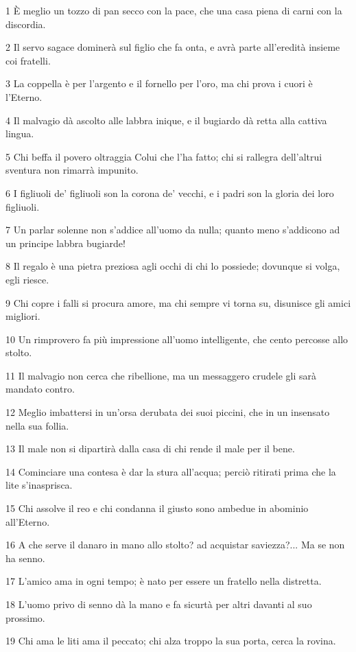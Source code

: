 \par 1 È meglio un tozzo di pan secco con la pace, che una casa piena di carni con la discordia.
\par 2 Il servo sagace dominerà sul figlio che fa onta, e avrà parte all'eredità insieme coi fratelli.
\par 3 La coppella è per l'argento e il fornello per l'oro, ma chi prova i cuori è l'Eterno.
\par 4 Il malvagio dà ascolto alle labbra inique, e il bugiardo dà retta alla cattiva lingua.
\par 5 Chi beffa il povero oltraggia Colui che l'ha fatto; chi si rallegra dell'altrui sventura non rimarrà impunito.
\par 6 I figliuoli de' figliuoli son la corona de' vecchi, e i padri son la gloria dei loro figliuoli.
\par 7 Un parlar solenne non s'addice all'uomo da nulla; quanto meno s'addicono ad un principe labbra bugiarde!
\par 8 Il regalo è una pietra preziosa agli occhi di chi lo possiede; dovunque si volga, egli riesce.
\par 9 Chi copre i falli si procura amore, ma chi sempre vi torna su, disunisce gli amici migliori.
\par 10 Un rimprovero fa più impressione all'uomo intelligente, che cento percosse allo stolto.
\par 11 Il malvagio non cerca che ribellione, ma un messaggero crudele gli sarà mandato contro.
\par 12 Meglio imbattersi in un'orsa derubata dei suoi piccini, che in un insensato nella sua follia.
\par 13 Il male non si dipartirà dalla casa di chi rende il male per il bene.
\par 14 Cominciare una contesa è dar la stura all'acqua; perciò ritirati prima che la lite s'inasprisca.
\par 15 Chi assolve il reo e chi condanna il giusto sono ambedue in abominio all'Eterno.
\par 16 A che serve il danaro in mano allo stolto? ad acquistar saviezza?... Ma se non ha senno.
\par 17 L'amico ama in ogni tempo; è nato per essere un fratello nella distretta.
\par 18 L'uomo privo di senno dà la mano e fa sicurtà per altri davanti al suo prossimo.
\par 19 Chi ama le liti ama il peccato; chi alza troppo la sua porta, cerca la rovina.
